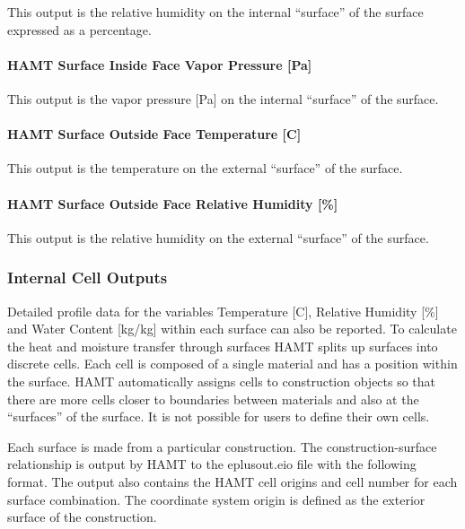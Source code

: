 This output is the relative humidity on the internal ``surface'' of the surface expressed as a percentage.

\paragraph{HAMT Surface Inside Face Vapor Pressure {[}Pa{]}}\label{hamt-surface-inside-face-vapor-pressure-pa}

This output is the vapor pressure {[}Pa{]} on the internal ``surface'' of the surface.

\paragraph{HAMT Surface Outside Face Temperature {[}C{]}}\label{hamt-surface-outside-face-temperature-c}

This output is the temperature on the external ``surface'' of the surface.

\paragraph{HAMT Surface Outside Face Relative Humidity {[}\%{]}}\label{hamt-surface-outside-face-relative-humidity}

This output is the relative humidity on the external ``surface'' of the surface.

\subsubsection{Internal Cell Outputs}\label{internal-cell-outputs}

Detailed profile data for the variables Temperature {[}C{]}, Relative Humidity {[}\%{]} and Water Content {[}kg/kg{]} within each surface can also be reported. To calculate the heat and moisture transfer through surfaces HAMT splits up surfaces into discrete cells. Each cell is composed of a single material and has a position within the surface. HAMT automatically assigns cells to construction objects so that there are more cells closer to boundaries between materials and also at the ``surfaces'' of the surface. It is not possible for users to define their own cells.

Each surface is made from a particular construction. The construction-surface relationship is output by HAMT to the eplusout.eio file with the following format. The output also contains the HAMT cell origins and cell number for each surface combination. The coordinate system origin is defined as the exterior surface of the construction.

